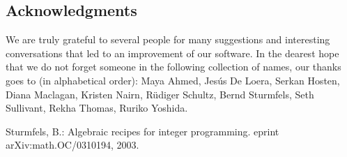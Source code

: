 \documentclass[12pt]{article}
\theoremstyle{definition}
\begin{document}
\subsection{Acknowledgments}

We are truly grateful to several people for many suggestions and
interesting conversations that led to an improvement of our
software. In the dearest hope that we do not forget someone in the
following collection of names, our thanks goes to (in alphabetical
order): Maya Ahmed, Jes\'us De Loera, Serkan Hosten, Diana Maclagan,
Kristen Nairn, R\"udiger Schultz, Bernd Sturmfels, Seth Sullivant,
Rekha Thomas, Ruriko Yoshida. 


\begin{thebibliography}{99}
Sturmfels, B.: Algebraic recipes for integer programming. 
eprint arXiv:math.OC/0310194, 2003.
\end{thebibliography}	
\end{document}
